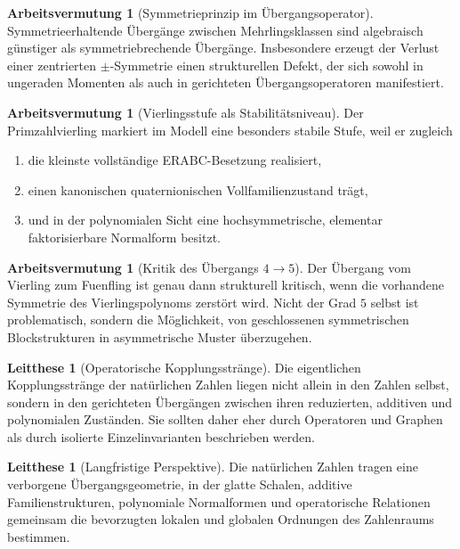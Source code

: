 \documentclass[11pt,a4paper]{article}
\theoremstyle{definition}
\newtheorem{arbeitsvermutung}[satz]{Arbeitsvermutung}
\newtheorem{leitthese}[satz]{Leitthese}
\begin{document}
\begin{arbeitsvermutung}[Symmetrieprinzip im Übergangsoperator]
Symmetrieerhaltende Übergänge zwischen Mehrlingsklassen sind algebraisch günstiger als symmetriebrechende Übergänge. Insbesondere erzeugt der Verlust einer zentrierten \(\pm\)-Symmetrie einen strukturellen Defekt, der sich sowohl in ungeraden Momenten als auch in gerichteten Übergangsoperatoren manifestiert.
\end{arbeitsvermutung}

\begin{arbeitsvermutung}[Vierlingsstufe als Stabilitätsniveau]
Der Primzahlvierling markiert im Modell eine besonders stabile Stufe, weil er zugleich
\begin{enumerate}[leftmargin=2em]
\item die kleinste vollständige ERABC-Besetzung realisiert,
\item einen kanonischen quaternionischen Vollfamilienzustand trägt,
\item und in der polynomialen Sicht eine hochsymmetrische, elementar faktorisierbare Normalform besitzt.
\end{enumerate}
\end{arbeitsvermutung}

\begin{arbeitsvermutung}[Kritik des Übergangs \(4\to 5\)]
Der Übergang vom Vierling zum Fuenfling ist genau dann strukturell kritisch, wenn die vorhandene Symmetrie des Vierlingspolynoms zerstört wird. Nicht der Grad \(5\) selbst ist problematisch, sondern die Möglichkeit, von geschlossenen symmetrischen Blockstrukturen in asymmetrische Muster überzugehen.
\end{arbeitsvermutung}

\begin{leitthese}[Operatorische Kopplungsstränge]
Die eigentlichen Kopplungsstränge der natürlichen Zahlen liegen nicht allein in den Zahlen selbst, sondern in den gerichteten Übergängen zwischen ihren reduzierten, additiven und polynomialen Zuständen. Sie sollten daher eher durch Operatoren und Graphen als durch isolierte Einzelinvarianten beschrieben werden.
\end{leitthese}

\begin{leitthese}[Langfristige Perspektive]
Die natürlichen Zahlen tragen eine verborgene Übergangsgeometrie, in der glatte Schalen, additive Familienstrukturen, polynomiale Normalformen und operatorische Relationen gemeinsam die bevorzugten lokalen und globalen Ordnungen des Zahlenraums bestimmen.
\end{leitthese}
\end{document}
